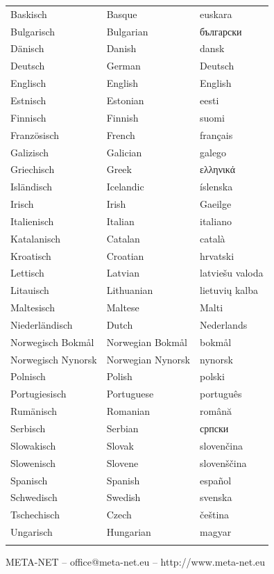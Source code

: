 \documentclass[]{../../metanetpaper}
\begin{document}
\begin{Parallel}[c]{79mm}{78mm}
\vfill
\centering
\begin{tabulary}{170mm}{LLL} \toprule
  Baskisch & Basque & euskara\\
  Bulgarisch & Bulgarian & български\\
  Dänisch & Danish & dansk\\
  Deutsch & German & Deutsch\\
  Englisch & English & English\\
  Estnisch & Estonian & eesti\\
  Finnisch & Finnish & suomi\\
  Französisch & French & français\\
  Galizisch & Galician & galego\\
  Griechisch & Greek & ελληνικά\\
  Isländisch & Icelandic & íslenska\\
  Irisch & Irish & Gaeilge\\
  Italienisch & Italian & italiano\\
  Katalanisch & Catalan & català\\
  Kroatisch & Croatian & hrvatski\\
  Lettisch & Latvian & latviešu valoda\\
  Litauisch & Lithuanian & lietuvių kalba\\
  Maltesisch & Maltese & Malti\\
  Niederländisch & Dutch & Nederlands\\
  Norwegisch Bokmål & Norwegian Bokmål & bokmål\\
  Norwegisch Nynorsk & Norwegian Nynorsk & nynorsk\\
  Polnisch & Polish & polski\\
  Portugiesisch & Portuguese & português\\
  Rumänisch & Romanian & română\\
  Serbisch & Serbian & српски\\
  Slowakisch & Slovak & slovenčina\\
  Slowenisch & Slovene & slovenščina\\
  Spanisch & Spanish & español\\
  Schwedisch & Swedish & svenska\\
  Tschechisch & Czech & čeština\\
  Ungarisch & Hungarian & magyar\\ \addlinespace \bottomrule
\end{tabulary}

\cleardoublepage
\vfill
\centerline{META-NET -- office@meta-net.eu -- http://www.meta-net.eu}

\end{Parallel}
\end{document}

